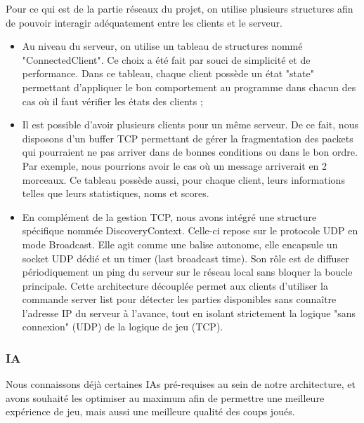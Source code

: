 \documentclass[11pt,a4paper,titlepage,oneside]{article}
\begin{document}
         Pour ce qui est de la partie réseaux du projet, on utilise plusieurs structures afin de pouvoir interagir adéquatement entre les clients et le serveur.
\begin{itemize}
        \item Au niveau du serveur, on utilise un tableau de structures nommé "ConnectedClient". Ce choix a été fait par souci de simplicité et de performance. Dans ce tableau, chaque client possède un état "state" permettant d'appliquer le bon comportement au programme dans chacun des cas où il faut vérifier les états des clients ;
        
        \item Il est possible d'avoir plusieurs clients pour un même serveur. De ce fait, nous disposons d'un buffer TCP permettant de gérer la fragmentation des packets qui pourraient ne pas arriver dans de bonnes conditions ou dans le bon ordre. Par exemple, nous pourrions avoir le cas où un message arriverait en 2 morceaux. Ce tableau possède aussi, pour chaque client, leurs informations telles que leurs statistiques, noms et scores. 
        
        \item En complément de la gestion TCP, nous avons intégré une structure spécifique nommée DiscoveryContext. Celle-ci repose sur le protocole UDP en mode Broadcast. Elle agit comme une balise autonome, elle encapsule un socket UDP dédié et un timer (last broadcast time). Son rôle est de diffuser périodiquement un ping du serveur sur le réseau local sans bloquer la boucle principale. Cette architecture découplée permet aux clients d'utiliser la commande server list pour détecter les parties disponibles sans connaître l'adresse IP du serveur à l'avance, tout en isolant strictement la logique "sans connexion" (UDP) de la logique de jeu (TCP).
\end{itemize}

    \subsubsection{IA}
     \label{sec:iastruc}

    Nous connaissons déjà certaines IAs pré-requises au sein de notre architecture, et avons souhaité les optimiser au maximum afin de permettre une meilleure expérience de jeu, mais aussi une meilleure qualité des coups joués.
\end{document}
